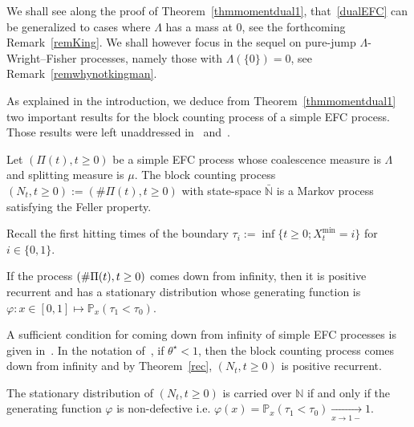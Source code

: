 \documentclass[AHL,Unicode,longabstracts,published]{cedram}
\newcommand{\bbN}{\mathbb{N}}
\newcommand{\bbP}{\mathbb{P}}
\begin{document}
\begin{rema}
We shall see along the proof of Theorem~\ref{thmmomentdual1}, that~\eqref{dualEFC} can be generalized to cases where $\Lambda$ has a mass at $0$, see the forthcoming Remark~\ref{remKing}. We shall however focus in the sequel on pure-jump $\Lambda$-Wright--Fisher processes, namely those with $\Lambda(\{0\})=0$, see Remark~\ref{remwhynotkingman}.
\end{rema}

As explained in the introduction, we deduce from Theorem~\ref{thmmomentdual1} two important results for the block counting process of a simple EFC process. Those results were left unaddressed in~\cite{cdiEFC} and~\cite{explosion}.

\begin{theo}\label{Markovblockcounting}
Let $(\Pi(t),t\geq 0)$ be a simple EFC process whose coalescence measure is $\Lambda$ and splitting measure is $\mu$. The block counting process $(N_t,t\geq 0):=(\#\Pi(t),t\geq 0)$ with state-space $\bar{\bbN}$ is a Markov process satisfying the Feller property.
\end{theo}

Recall the first hitting times of the boundary $\tau_i:=\inf\{t\geq 0; X_t^{\min}=i\}$ for $i\in \{0,1\}$.
\begin{theo} \label{rec}
If the process $(\#\Pi(t),\linebreak t\geq 0)$ comes down from infinity, then it is positive recurrent and has a stationary distribution whose generating function is $\varphi:x\in [0,1] \mapsto \bbP_x(\tau_1<\tau_0)$.
\end{theo}

\begin{rema}
A sufficient condition for coming down from infinity of simple EFC processes is given in~\cite[Theorem~1.1]{cdiEFC}. In the notation of~\cite{cdiEFC}, if $\theta^{\star}<1$, then the block counting process comes down from infinity and by Theorem~\ref{rec}, $(N_t,t\geq 0)$ is positive recurrent.
\end{rema}

\begin{rema}
The stationary distribution of $(N_t,t\geq 0)$ is carried over $\bbN$ if and only if the generating function $\varphi$ is non-defective i.e. $\varphi(x)=\bbP_x(\tau_1<\tau_0)\underset{x\rightarrow 1-}{\longrightarrow} 1$.
\end{rema}
\end{document}
